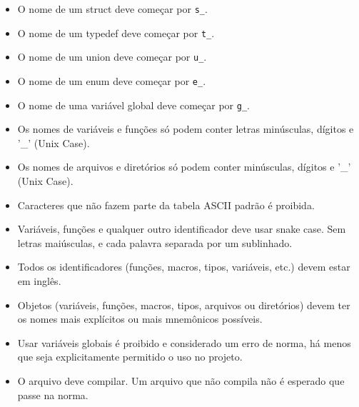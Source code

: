 \documentclass{42-pt}
\begin{document}
        \begin{itemize}

            \item O nome de um struct deve começar por
                \texttt{s\_}.

            \item O nome de um typedef deve começar por
                \texttt{t\_}.

            \item O nome de um union deve começar por \texttt{u\_}.

            \item O nome de um enum deve começar por \texttt{e\_}.

            \item O nome de uma variável global deve começar por \texttt{g\_}.

            \item Os nomes de variáveis e funções só podem conter letras minúsculas,
             dígitos e '\_' (Unix Case).

            \item Os nomes de arquivos e diretórios só podem conter minúsculas, dígitos e
                '\_' (Unix Case).

            \item Caracteres que não fazem parte 
                da tabela ASCII padrão é proibida.

            \item Variáveis, funções e qualquer outro identificador deve usar
                snake case. Sem letras maiúsculas, e cada palavra separada por um
                sublinhado.

            \item Todos os identificadores (funções, macros, tipos,
                variáveis, etc.) devem estar em inglês.

            \item Objetos (variáveis, funções, macros, tipos,
                arquivos ou diretórios) devem ter os
                nomes mais explícitos ou mais mnemônicos possíveis.

            \item Usar variáveis globais é proibido e considerado um erro de norma, há menos que seja explicitamente permitido o uso no projeto.

            \item O arquivo deve compilar. Um arquivo que não compila não é esperado
                que passe na norma.
        \end{itemize}
\newpage
\end{document}
